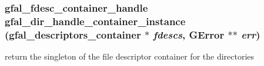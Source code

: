 \subsubsection{\setlength{\rightskip}{0pt plus 5cm}gfal\_\-fdesc\_\-container\_\-handle gfal\_\-dir\_\-handle\_\-container\_\-instance (gfal\_\-descriptors\_\-container $\ast$ {\em fdescs}, GError $\ast$$\ast$ {\em err})}\label{gfal__common__dir__handle_8h_0973d623e1abd39d0830739b0710512f}


return the singleton of the file descriptor container for the directories 